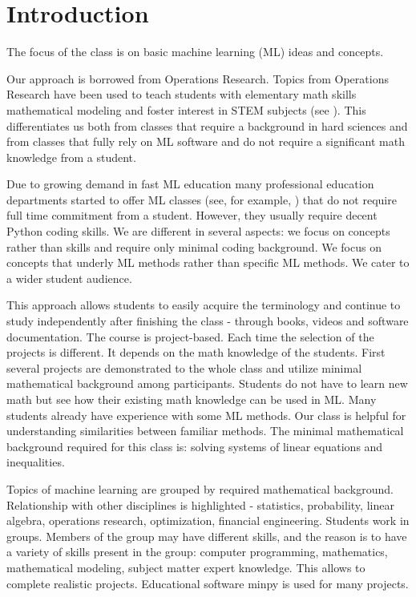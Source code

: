 \documentclass{article} %
\begin{document}
    \section{Introduction} %

The focus of the class is on basic machine learning (ML) ideas and concepts. 

Our approach is borrowed from Operations Research. Topics from Operations Research have been used to teach students with elementary math skills mathematical modeling and foster interest in STEM subjects (see \cite{RG}). This differentiates us both from classes that require a background in hard sciences and from classes that fully rely on ML software and do not require a significant math knowledge from a student.

Due to growing demand in fast ML education many professional education departments started to offer ML classes (see, for example, \cite{MITML,GMUML,UUML}) that do not require full time commitment from a student. However, they usually require decent Python coding skills. We are different in several aspects: we focus on concepts rather than skills and require only minimal coding background. We focus on concepts that underly ML methods rather than specific ML methods. We cater to a wider student audience.

This approach allows students to easily acquire the terminology and continue to study independently after finishing the class -  through books, videos  and software documentation.  The course is project-based. Each time the selection of the projects is different. It depends on the math knowledge of the students. First several projects are demonstrated to the whole class and utilize minimal mathematical background among participants. Students do not have to learn new math but see how their existing math knowledge can be used in ML.   Many students already have experience with some ML methods. Our class is helpful for understanding similarities between familiar methods.  The minimal mathematical background required for this class is: solving systems of linear equations and inequalities.

 Topics of machine learning are grouped by required mathematical background. Relationship with other disciplines is highlighted - statistics, probability, linear algebra, operations research, optimization, financial engineering. Students work in groups.  Members of the group may have different skills, and the reason is to have a variety of skills present in the group: computer programming, mathematics, mathematical modeling, subject matter expert knowledge. This allows to complete realistic projects. Educational software minpy \cite{MP} is used for many projects.
\end{document}
